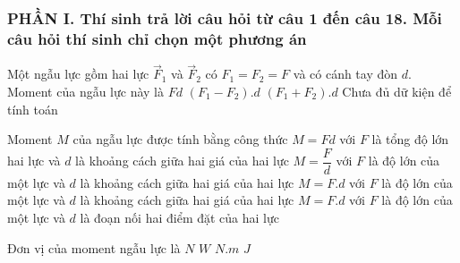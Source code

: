 \subsubsection*{PHẦN I. Thí sinh trả lời câu hỏi từ câu 1 đến câu 18. Mỗi câu hỏi thí sinh chỉ chọn một phương án}
\setcounter{ex}{0}
\begin{ex}%
Một ngẫu lực gồm hai lực $\vec F_1 $ và $\vec F_2 $ có $F_1 = F_2 = F$ và có cánh tay đòn $d$. Moment của ngẫu lực này là
\choice
{\True $Fd$}
{$\left(F_1 - F_2\right).d$}
{$\left(F_1 + F_2\right).d$}
{Chưa đủ dữ kiện để tính toán}
\end{ex}
\begin{ex}%
Moment $M$ của ngẫu lực được tính bằng công thức
\choice
{$M = Fd$ với $F$ là tổng độ lớn hai lực và $d$ là khoảng cách giữa hai giá của hai lực}
{$M=\dfrac{F}{d}$ với $F$ là độ lớn của một lực và $d$ là khoảng cách giữa hai giá của hai lực}
{\True $M = F.d$ với $F$ là độ lớn của một lực và $d$ là khoảng cách giữa hai giá của hai lực}
{$M = F.d$ với $F$ là độ lớn của một lực và $d$ là đoạn nối hai điểm đặt của hai lực}
\end{ex}
\begin{ex}%
Đơn vị của moment ngẫu lực là
\choice
{$N$}
{$W$}
{\True $N.m$}
{$J$}
\end{ex}

